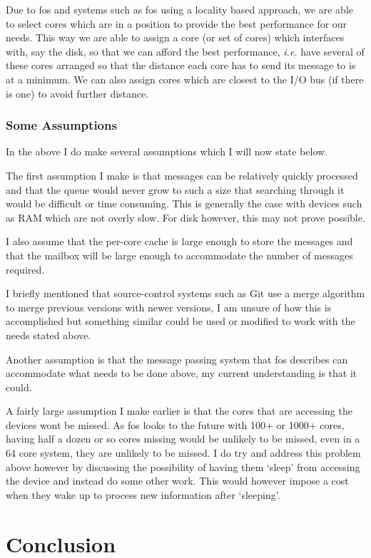 \documentclass[journal]{IEEEtran}
\begin{document}
Due to fos and systems such as fos using a locality based approach, we are able to select cores which are in a position to provide the best performance for our needs. This way we are able to assign a core (or set of cores) which interfaces with, say the disk, so that we can afford the best performance, \emph{i.e.} have several of these cores arranged so that the distance each core has to send its message to is at a minimum. We can also assign cores which are closest to the I/O bus (if there is one) to avoid further distance. 

\subsubsection{Some Assumptions}
In the above I do make several assumptions which I will now state below.

The first assumption I make is that messages can be relatively quickly processed and that the queue would never grow to such a size that searching through it would be difficult or time consuming. This is generally the case with devices such as RAM which are not overly slow. For disk however, this may not prove possible. 

I also assume that the per-core cache is large enough to store the messages and that the mailbox will be large enough to accommodate the number of messages required.

I briefly mentioned that source-control systems such as Git use a merge algorithm to merge previous versions with newer versions, I am unsure of how this is accomplished but something similar could be used or modified to work with the needs stated above.

Another assumption is that the message passing system that fos describes can accommodate what needs to be done above, my current understanding is that it could. 

A fairly large assumption I make earlier is that the cores that are accessing the devices wont be missed. As fos looks to the future with 100+ or 1000+ cores, having half a dozen or so cores missing would be unlikely to be missed, even in a 64 core system, they are unlikely to be missed. I do try and address this problem above however by discussing the possibility of having them `sleep' from accessing the device and instead do some other work. This would however impose a cost when they wake up to process new information after `sleeping'.

\section{Conclusion}
\end{document}

